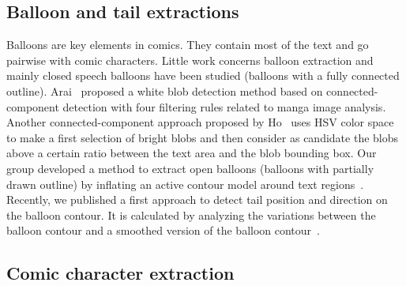 \documentclass[conference]{IEEEtran}
\begin{document}
  \subsection{Balloon and tail extractions} %
  \label{sub:balloon_extraction_review}
    Balloons are key elements in comics.
    They contain most of the text and go pairwise with comic characters.
    Little work concerns balloon extraction and mainly closed speech balloons have been studied (balloons with a fully connected outline).
    Arai~\cite{Arai11} proposed a white blob detection method based on connected-component detection with four filtering rules related to manga image analysis.
    Another connected-component approach proposed by Ho~\cite{Ho2012} uses HSV color space to make a first selection of bright blobs and then consider as candidate the blobs above a certain ratio between the text area and the blob bounding box.
    Our group developed a method to extract open balloons (balloons with partially drawn outline) by inflating an active contour model around text regions~\cite{rigaud2013active}.
    Recently, we published a first approach to detect tail position and direction on the balloon contour.
    It is calculated by analyzing the variations between the balloon contour and a smoothed version of the balloon contour~\cite{Guerin2014Reduction}.



  \subsection{Comic character extraction} %
  \label{sub:comic_character_extraction}
  
\end{document}
